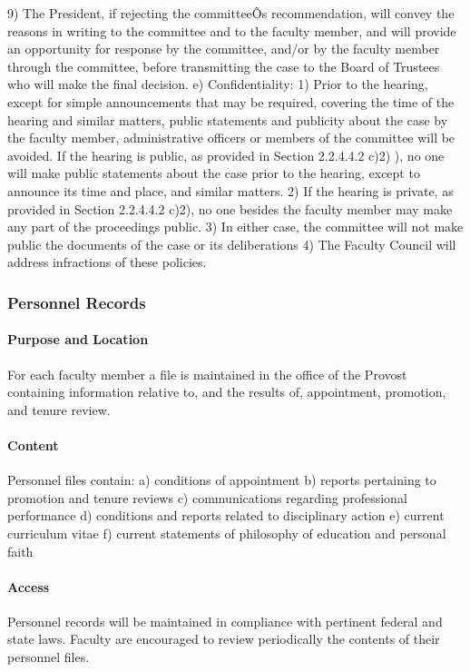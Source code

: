\documentclass[letterpaper, 11pt]{article}
\begin{document}
				9) The President, if rejecting the committeeÕs recommendation, will convey the reasons in writing to the committee and to the faculty member, and will provide an opportunity for response by the committee, and/or by the faculty member through the committee, before transmitting the case to the Board of Trustees who will make the final decision.
				e) Confidentiality:
				1) Prior to the hearing, except for simple announcements that may be required, covering the time of the hearing and similar matters, public statements and publicity about the case by the faculty member, administrative officers or members of the committee will be avoided.  If the hearing is public, as provided in Section 2.2.4.4.2 c)2) ), no one will make public statements about the case prior to the hearing, except to announce its time and place, and similar matters.
				2) If the hearing is private, as provided in Section 2.2.4.4.2 c)2), no one besides the faculty member may make any part of the proceedings public.
				3) In either case, the committee will not make public the documents of the case or its deliberations
				4) The Faculty Council will address infractions of these policies.
		\subsubsection{Personnel Records}
			\paragraph{Purpose and Location}
				For each faculty member a file is maintained in the office of the Provost containing information relative to, and the results of, appointment, promotion, and tenure review.
			\paragraph{Content}
				Personnel files contain:
				a) conditions of appointment
				b) reports pertaining to promotion and tenure reviews
				c) communications regarding professional performance
				d) conditions and reports related to disciplinary action
				e) current curriculum vitae
				f) current statements of philosophy of education and personal faith
			\paragraph{Access}
				Personnel records will be maintained in compliance with pertinent federal and state laws.  Faculty are encouraged to review periodically the contents of their personnel files.
\end{document}

